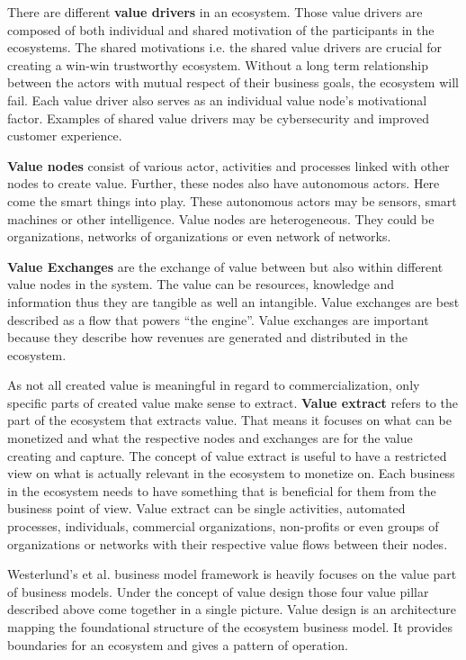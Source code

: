 		There are different \textbf{value drivers} in an ecosystem. Those value drivers are composed of both individual and shared motivation of the participants in the ecosystems. The shared motivations i.e. the shared value drivers are crucial for creating a win-win trustworthy ecosystem. Without a long term relationship between the actors with mutual respect of their business goals, the ecosystem will fail. Each value driver also serves as an individual value node's motivational factor. Examples of shared value drivers may be cybersecurity and improved customer experience.

		\textbf{Value nodes} consist of various actor, activities and processes linked with other nodes to create value. Further, these nodes also have autonomous actors. Here come the smart things into play. These autonomous actors may be sensors, smart machines or other intelligence. Value nodes are heterogeneous. They could be organizations, networks of organizations or even network of networks.

		\textbf{Value Exchanges} are the exchange of value between but also within different value nodes in the system. The value can be resources, knowledge and information thus they are tangible as well an intangible. Value exchanges are best described as a flow that powers ``the engine''. Value exchanges are important because they describe how revenues are generated and distributed in the ecosystem.

		As not all created value is meaningful in regard to commercialization, only specific parts of created value make sense to extract. \textbf{Value extract} refers to the part of the ecosystem that extracts value. That means it focuses on what can be monetized and what the respective nodes and exchanges are for the value creating and capture. The concept of value extract is useful to have a restricted view on what is actually relevant in the ecosystem to monetize on. Each business in the ecosystem needs to have something that is beneficial for them from the business point of view. Value extract can be single activities, automated processes, individuals, commercial organizations, non-profits or even groups of organizations or networks with their respective value flows between their nodes.

		Westerlund's et al. business model framework is heavily focuses on the value part of business models. Under the concept of value design those four value pillar described above come together in a single picture. Value design is an architecture mapping the foundational structure of the ecosystem business model. It provides boundaries for an ecosystem and gives a pattern of operation.

